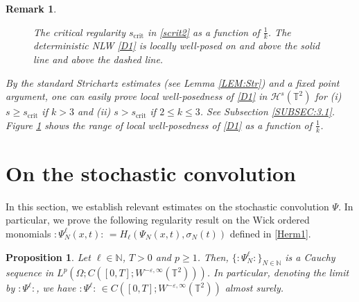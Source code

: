 \documentclass[letterpaper, 11pt,  reqno]{amsart}
\newtheorem{proposition}[theorem]{Proposition}
\newtheorem{remark}[theorem]{Remark}
\newcommand{\1}{\hspace{0.5mm}\text{I}\hspace{0.5mm}}
\newcommand{\T}{\mathbb{T}}
\newcommand{\eps}{\varepsilon}
\newcommand{\s}{\sigma}
\renewcommand{\l}{\ell}
\newcommand{\N}{\mathbb{N}}
\renewcommand{\H}{\mathcal{H}}
\numberwithin{equation}{section}
\numberwithin{theorem}{section}
\begin{document}
\begin{remark}
\begin{figure}
\begin{center}
\end{center} 





\caption{The critical regularity $s_{\text{crit}}$ in \eqref{scrit2} as a function of $\frac 1k$.
The deterministic NLW \eqref{D1} is locally well-posed on and above the solid line
and above the dashed line.}
 \label{FIG:1}

\end{figure}

By the standard Strichartz estimates (see Lemma \ref{LEM:Str})
and a fixed point argument, 
one can easily prove local well-posedness of \eqref{D1}
in $\H^{s} (\T^2)$
for  (i) $s \geq     s_\text{crit}$ if $k >3$ 
and (ii)  $s> s_\text{crit}$ if $ 2 \leq k \leq 3$.
See Subsection \ref{SUBSEC:3.1}.
Figure \ref{FIG:1} shows the range of local well-posedness
of \eqref{D1}
as a function of $\frac{1}{k}$.



\end{remark}
	


\section{On the stochastic convolution}
\label{SEC:2}

In this section, we establish relevant estimates on 
the stochastic convolution $\Psi$.
In particular, we prove 
the following regularity result  on the Wick ordered monomials 
$:\!\Psi^\l_N(x, t) \!: \, = H_\ell(\Psi_N(x, t),\sigma_N(t))$
defined in \eqref{Herm1}.




\begin{proposition}\label{PROP:sconv}
Let  $\l \in \N$, $T >0$ and $p\ge 1$. 
Then, $\{ :\!\Psi^\l_N \!:  \}_{N \in \mathbb{N}}$ %
is a Cauchy sequence in $L^p(\Omega; C([0,T];W^{-\eps,\infty}(\T^2)))$.
In particular, denoting the limit by  $:\!\Psi^\l\!:$,    
we have  $:\!\Psi^\l\!:\, \in C([0,T];W^{-\eps,\infty}(\T^2))$ almost surely.
\end{proposition}
\end{document}
